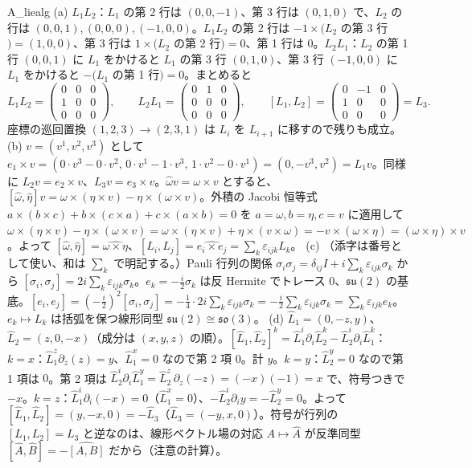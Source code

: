 \begin{soll}{A_liealg}
(a) $L_1L_2$：$L_1$ の第 2 行は $(0,0,-1)$、第 3 行は $(0,1,0)$ で、$L_2$ の行は $(0,0,1),(0,0,0),(-1,0,0)$。$L_1L_2$ の第 2 行は $-1\times(L_2$ の第 3 行$)=(1,0,0)$、第 3 行は $1\times(L_2$ の第 2 行$)=0$、第 1 行は $0$。$L_2L_1$：$L_2$ の第 1 行 $(0,0,1)$ に $L_1$ をかけると $L_1$ の第 3 行 $(0,1,0)$、第 3 行 $(-1,0,0)$ に $L_1$ をかけると $-(L_1$ の第 1 行$)=0$。まとめると
\[
L_1L_2=\begin{pmatrix}0&0&0\\1&0&0\\0&0&0\end{pmatrix},\qquad L_2L_1=\begin{pmatrix}0&1&0\\0&0&0\\0&0&0\end{pmatrix},\qquad [L_1,L_2]=\begin{pmatrix}0&-1&0\\1&0&0\\0&0&0\end{pmatrix}=L_3 .
\]座標の巡回置換 $(1,2,3)\to(2,3,1)$ は $L_i$ を $L_{i+1}$ に移すので残りも成立。
(b) $v=(v^1,v^2,v^3)$ として $e_1\times v=(0\cdot v^3-0\cdot v^2,\,0\cdot v^1-1\cdot v^3,\,1\cdot v^2-0\cdot v^1)=(0,-v^3,v^2)=L_1v$。同様に $L_2v=e_2\times v$、$L_3v=e_3\times v$。$\hat\omega v=\omega\times v$ とすると、$[\hat\omega,\hat\eta]v=\omega\times(\eta\times v)-\eta\times(\omega\times v)$。外積の Jacobi 恒等式 $a\times(b\times c)+b\times(c\times a)+c\times(a\times b)=0$ を $a=\omega,b=\eta,c=v$ に適用して $\omega\times(\eta\times v)-\eta\times(\omega\times v)=\omega\times(\eta\times v)+\eta\times(v\times\omega)=-v\times(\omega\times\eta)=(\omega\times\eta)\times v$。よって $[\hat\omega,\hat\eta]=\widehat{\omega\times\eta}$、$[L_i,L_j]=\widehat{e_i\times e_j}=\sum_k\varepsilon_{ijk}L_k$。
(c) （添字は番号として使い、和は $\sum_k$ で明記する。）Pauli 行列の関係 $\sigma_i\sigma_j=\delta_{ij}I+i\sum_k\varepsilon_{ijk}\sigma_k$ から $[\sigma_i,\sigma_j]=2i\sum_k\varepsilon_{ijk}\sigma_k$。$e_k=-\frac i2\sigma_k$ は反 Hermite でトレース $0$、$\mathfrak{su}(2)$ の基底。$[e_i,e_j]=(-\frac i2)^2[\sigma_i,\sigma_j]=-\frac14\cdot2i\sum_k\varepsilon_{ijk}\sigma_k=-\frac i2\sum_k\varepsilon_{ijk}\sigma_k=\sum_k\varepsilon_{ijk}e_k$。$e_k\mapsto L_k$ は括弧を保つ線形同型 $\mathfrak{su}(2)\cong\mathfrak{so}(3)$。
(d) $\hat L_1=(0,-z,y)$、$\hat L_2=(z,0,-x)$（成分は $(x,y,z)$ の順）。$[\hat L_1,\hat L_2]^k=\hat L_1^i\partial_i\hat L_2^k-\hat L_2^i\partial_i\hat L_1^k$：$k=x$：$\hat L_1^z\partial_z(z)=y$、$\hat L_1^x=0$ なので第 2 項 $0$。計 $y$。$k=y$：$\hat L_2^y=0$ なので第 1 項は $0$。第 2 項は $\hat L_2^i\partial_i\hat L_1^y=\hat L_2^z\,\partial_z(-z)=(-x)(-1)=x$ で、符号つきで $-x$。$k=z$：$\hat L_1^i\partial_i(-x)=0$（$\hat L_1^x=0$）、$-\hat L_2^i\partial_iy=-\hat L_2^y=0$。よって $[\hat L_1,\hat L_2]=(y,-x,0)=-\hat L_3$（$\hat L_3=(-y,x,0)$）。符号が行列の $[L_1,L_2]=L_3$ と逆なのは、線形ベクトル場の対応 $A\mapsto\hat A$ が反準同型 $[\hat A,\hat B]=-\widehat{[A,B]}$ だから（注意の計算）。
\end{soll}


